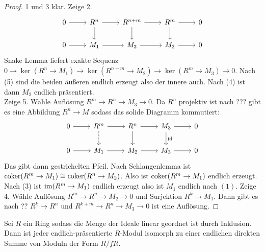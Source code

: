 \begin{proof}
    1 und 3 klar.
    Zeige 2. $$%
\begin{tikzcd}
0 \arrow[r] & R^n \arrow[d] \arrow[r] & R^{n+m} \arrow[d] \arrow[r] & R^m \arrow[d] \arrow[r] & 0 \\
0 \arrow[r] & M_1 \arrow[r]           & M_2 \arrow[r]               & M_3 \arrow[r]           & 0
\end{tikzcd}$$
Snake Lemma liefert exakte Sequenz $0\to \ker(R^n\to M_1)\to \ker(R^{n+m}\to M_2)\to \ker(R^m\to M_3)\to 0$.
Nach (5) sind die beiden äußeren endlich erzeugt also der innere auch. Nach (4) ist dann $M_2$ endlich präsentiert.\\
Zeige 5. Wähle Auflösung $R^m\to R^n\to M_3\to 0$. Da $R^n$ projektiv ist nach ??? gibt es eine Abbildung $R^n\to M$ sodass das solide Diagramm kommutiert:$$%
\begin{tikzcd}
0 \arrow[r] & R^m \arrow[d, dashed] \arrow[r] & R^{n} \arrow[d] \arrow[r] & M_3 \arrow[d, "\id"] \arrow[r] & 0 \\
0 \arrow[r] & M_1 \arrow[r]                   & M_2 \arrow[r]             & M_3 \arrow[r]                  & 0
\end{tikzcd}$$ Das gibt dann gestrichelten Pfeil. Nach Schlangenlemma ist $\operatorname{coker}(R^m\to M_1)\cong \operatorname{coker}(R^n\to M_2)$. Also ist $\operatorname{coker}(R^m\to M_1)$ endlich erzeugt. Nach (3) ist $\operatorname{im}(R^m\to M_1)$ endlich erzeugt also ist $M_1$ endlich nach $(1)$.
Zeige 4. Wähle Auflösung $R^m\to R^n\to M_2\to 0$ und Surjektion $R^k\to M_1$. Dann gibt es nach ?? $R^k\to R^n$ und $R^{k+m}\to R^n\to M_3\to 0$ ist eine Auflösung.
\end{proof}
\begin{Lemma}\label{Lem:EndlPräsDirSum}
    Sei $R$ ein Ring sodass die Menge der Ideale linear geordnet ist durch Inklusion. Dann ist jeder endlich-präsentierte $R$-Modul isomorph zu einer endlichen direkten Summe von Moduln der Form $R/fR$.
\end{Lemma}
